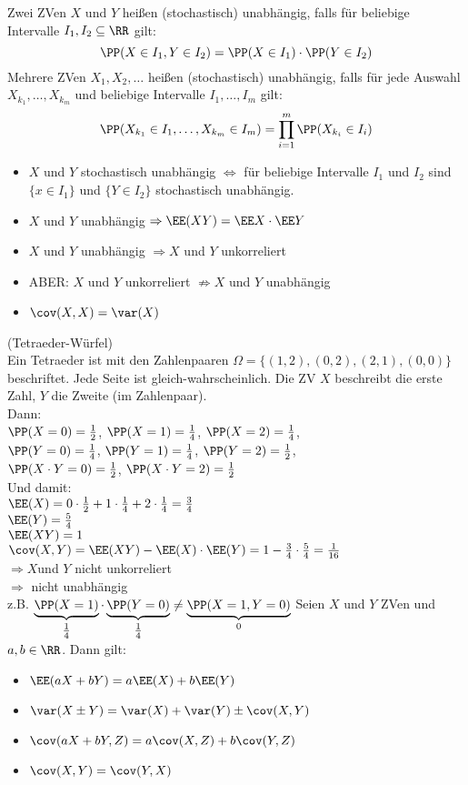 \documentclass{scrreprt}
\begin{document}
 Zwei ZVen $X$ und $Y$ heißen (stochastisch) unabhängig, falls für beliebige Intervalle $I_1, I_2 \subseteq \RR$ gilt:
$$\PP(X\in I_1, Y\in I_2)=\PP(X\in I_1) \cdot \PP(Y \in I_2)$$
Mehrere ZVen $X_1, X_2, \dots$ heißen (stochastisch) unabhängig, falls für jede Auswahl $X_{k_1}, \dots , X_{k_m}$ und beliebige Intervalle $I_1, \dots, I_m$ gilt:
$$\PP(X_{k_1}\in I_1 , \dots , X_{k_m}\in I_m)=\prod_{i=1}^m \PP(X_{k_i}\in I_i)$$

\begin{itemize}
\item $X$ und $Y$ stochastisch unabhängig $\Leftrightarrow$ für beliebige Intervalle $I_1$ und $I_2$ sind $\{x\in I_1\}$ und $\{ Y \in I_2\}$ stochastisch unabhängig.
\item $X$ und $Y$ unabhängig $\Rightarrow \EE(XY)=\EE X \cdot \EE Y$
\item $X$ und $Y$ unabhängig $\Rightarrow X$ und $Y$ unkorreliert
\item ABER: $X$ und $Y$ unkorreliert $\not\Rightarrow X$ und $Y$ unabhängig
\item $\cov(X,X) = \var(X)$
\end{itemize}

 (Tetraeder-Würfel)\\
Ein Tetraeder ist mit den Zahlenpaaren $\Omega=\{(1,2),(0,2),(2,1),(0,0)\}$ beschriftet. Jede Seite ist gleich-wahrscheinlich. Die ZV $X$ beschreibt die erste Zahl, $Y$ die Zweite (im Zahlenpaar).\\
Dann:\\
$\PP(X=0)=\tfrac{1}{2}$, $\PP(X=1)=\tfrac{1}{4}$, $\PP(X=2) = \tfrac{1}{4}$,\\ $\PP(Y=0) = \tfrac{1}{4}$,
$\PP(Y=1) = \tfrac{1}{4}$, $\PP(Y=2) = \tfrac{1}{2}$, \\$\PP(X\cdot Y=0) = \tfrac{1}{2}$, $\PP(X\cdot Y = 2) = \tfrac{1}{2}$\\
Und damit:\\
$\EE(X)=0\cdot \frac{1}{2}+1 \cdot \frac{1}{4}+2\cdot \frac{1}{4}=\frac{3}{4}$\\
$\EE(Y)=\frac{5}{4}$\\
$\EE(XY)=1$\\
$\cov(X,Y)=\EE(XY)-\EE(X)\cdot \EE(Y)=1-\frac{3}{4}\cdot\frac{5}{4}=\frac{1}{16}$\\
$\Rightarrow X$und $Y$ nicht unkorreliert\\
$\Rightarrow$ nicht unabhängig\\
z.B. $\underbrace{\PP(X=1)}_{\tfrac{1}{4}}\cdot \underbrace{\PP(Y=0)}_{\tfrac{1}{4}} \not = \underbrace{\PP(X=1,Y=0)}_{0}$
 Seien $X$ und $Y$ ZVen und $a,b\in \RR$. Dann gilt:
\begin{itemize}
\item $\EE(aX+bY)=a\EE(X)+b\EE(Y)$
\item $\var(X\pm Y) = \var(X)+\var(Y)\pm \cov(X,Y)$
\item $\cov(aX+bY,Z)=a\cov(X,Z)+b\cov(Y,Z)$
\item $\cov(X,Y)=\cov(Y,X)$
\end{itemize}
\end{document}
